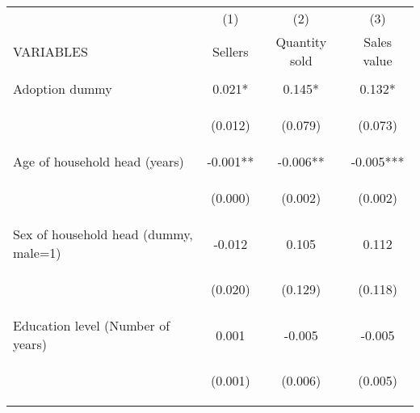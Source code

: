 \begin{center}
\begin{tabular}{lccc} \hline
 & (1) & (2) & (3) \\
VARIABLES & Sellers & Quantity sold & Sales value \\ \hline
\vspace{4pt} & \begin{footnotesize}\end{footnotesize} & \begin{footnotesize}\end{footnotesize} & \begin{footnotesize}\end{footnotesize} \\
Adoption dummy & 0.021* & 0.145* & 0.132* \\
\vspace{4pt} & \begin{footnotesize}(0.012)\end{footnotesize} & \begin{footnotesize}(0.079)\end{footnotesize} & \begin{footnotesize}(0.073)\end{footnotesize} \\
Age of household head (years) & -0.001** & -0.006** & -0.005*** \\
\vspace{4pt} & \begin{footnotesize}(0.000)\end{footnotesize} & \begin{footnotesize}(0.002)\end{footnotesize} & \begin{footnotesize}(0.002)\end{footnotesize} \\
Sex of household head (dummy, male=1) & -0.012 & 0.105 & 0.112 \\
\vspace{4pt} & \begin{footnotesize}(0.020)\end{footnotesize} & \begin{footnotesize}(0.129)\end{footnotesize} & \begin{footnotesize}(0.118)\end{footnotesize} \\
Education level (Number of years) & 0.001 & -0.005 & -0.005 \\
\vspace{4pt} & \begin{footnotesize}(0.001)\end{footnotesize} & \begin{footnotesize}(0.006)\end{footnotesize} & \begin{footnotesize}(0.005)\end{footnotesize} \\

\end{tabular}
\end{center}
